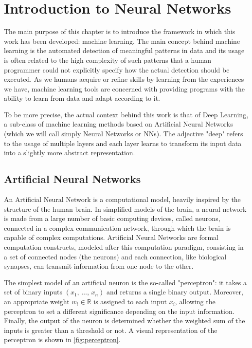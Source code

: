 \chapter{Introduction to Neural Networks}
\label{chap:MachineLearning}

The main purpose of this chapter is to introduce the framework in which this work has been developed: machine learning.
The main concept behind machine learning is the automated detection of meaningful patterns in data and its usage is
often related to the high complexity of such patterns that a human programmer could not explicitly specify how the actual
detection should be executed. As we humans acquire or refine skills by learning from the experiences we have, machine
learning tools are concerned with providing programs with the ability to learn from data and adapt according to it. 

To be more precise, the actual context behind this work is that of Deep Learning, a sub-class of machine learning
methods based on Artificial Neural Networks (which we will call simply Neural Networks or NNs). The adjective "deep"
refers to the usage of multiple layers and each layer learns to transform its input data into a slightly more abstract
representation. 

\section{Artificial Neural Networks}
\label{sec:nn}

An Artificial Neural Network is a computational model, heavily inspired by the structure of the human brain. In
simplified models of the brain, a neural network is made from a large number of basic computing devices, called neurons,
connected in a complex communication network, through which the brain is capable of complex computations.
Artificial Neural Networks are formal computation constructs, modeled after this computation paradigm, consisting in a
set of connected nodes (the neurons) and each connection, like biological synapses, can transmit information from one
node to the other.

The simplest model of an artificial neuron is the so-called "perceptron": it takes a set of binary inputs $(x_{1},\,
\ldots,\, x_{n})$ and returns a single binary output. Moreover, an appropriate weight $w_i\in\mathbb{R}$ is assigned to
each input $x_i$, allowing the perceptron to set a different significance depending on the input information. Finally,
the output of the neuron is determined whether the weighted sum of the inputs is greater than a threshold or not. A
visual representation of the perceptron is shown in \autoref{fig:perceptron}.

